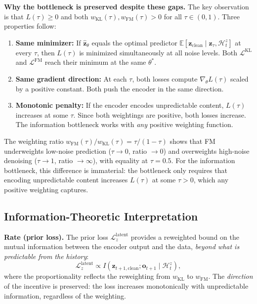 \documentclass{article}
\newcommand{\vo}{\bm{o}}
\newcommand{\vz}{\bm{z}}
\newcommand{\E}{\mathbb{E}}
\newcommand{\KL}{\mathrm{KL}}
\newcommand{\loss}{\mathcal{L}}
\begin{document}
\textbf{Why the bottleneck is preserved despite these gaps.}
The key observation is that $L(\tau) \geq 0$ and both $w_{\KL}(\tau), w_{\text{FM}}(\tau) > 0$ for all $\tau \in (0,1)$.
Three properties follow:
\begin{enumerate}[leftmargin=*,itemsep=2pt]
  \item \textbf{Same minimizer:} If $\hat{\vz}_\theta$ equals the optimal predictor $\E[\vz_{\text{clean}} \mid \vz_\tau, \mathcal{H}_t^z]$ at every $\tau$, then $L(\tau)$ is minimized simultaneously at all noise levels. Both $\loss^{\KL}$ and $\loss^{\text{FM}}$ reach their minimum at the same $\theta^*$.
  \item \textbf{Same gradient direction:} At each $\tau$, both losses compute $\nabla_\theta L(\tau)$ scaled by a positive constant. Both push the encoder in the same direction.
  \item \textbf{Monotonic penalty:} If the encoder encodes unpredictable content, $L(\tau)$ increases at some $\tau$. Since both weightings are positive, both losses increase. The information bottleneck works with \emph{any} positive weighting function.
\end{enumerate}

The weighting ratio $w_{\text{FM}}(\tau)/w_{\KL}(\tau) = \tau/(1-\tau)$ shows that FM underweights low-noise prediction ($\tau \to 0$, ratio $\to 0$) and overweights high-noise denoising ($\tau \to 1$, ratio $\to \infty$), with equality at $\tau = 0.5$.
For the information bottleneck, this difference is immaterial: the bottleneck only requires that encoding unpredictable content increases $L(\tau)$ at some $\tau > 0$, which any positive weighting captures.

\subsection{Information-Theoretic Interpretation}

\textbf{Rate (prior loss).}
The prior loss $\loss_z^{\text{latent}}$ provides a reweighted bound on the mutual information between the encoder output and the data, \emph{beyond what is predictable from the history}:
\begin{equation}
  \loss_z^{\text{latent}} \propto I(\vz_{t+1,\text{clean}}; \vo_{t+1} \mid \mathcal{H}_t^z),
  \label{eq:rate_bound}
\end{equation}
where the proportionality reflects the reweighting from $w_{\KL}$ to $w_{\text{FM}}$. The \emph{direction} of the incentive is preserved: the loss increases monotonically with unpredictable information, regardless of the weighting.
\end{document}
